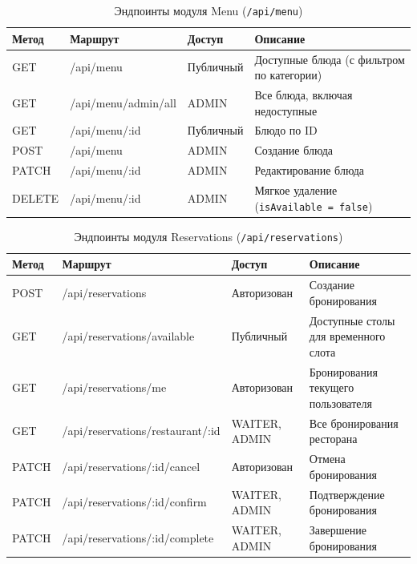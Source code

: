 \begin{table}[H]
\centering
\caption{Эндпоинты модуля Menu (\texttt{/api/menu})}
\label{tab:api_menu}
\begin{tabular}{|p{1.8cm}|p{5.4cm}|p{2.6cm}|p{4.8cm}|}
\hline
\textbf{Метод} & \textbf{Маршрут} & \textbf{Доступ} &
\textbf{Описание} \\
\hline
GET    & /api/menu           & Публичный &
  Доступные блюда (с фильтром по категории) \\ \hline
GET    & /api/menu/admin/all & ADMIN &
  Все блюда, включая недоступные \\ \hline
GET    & /api/menu/:id       & Публичный &
  Блюдо по ID \\ \hline
POST   & /api/menu           & ADMIN &
  Создание блюда \\ \hline
PATCH  & /api/menu/:id       & ADMIN &
  Редактирование блюда \\ \hline
DELETE & /api/menu/:id       & ADMIN &
  Мягкое удаление (\texttt{isAvailable = false}) \\ \hline
\end{tabular}
\end{table}
\begin{table}[H]
\centering
\caption{Эндпоинты модуля Reservations (\texttt{/api/reservations})}
\label{tab:api_reservations}
\begin{tabular}{|p{1.4cm}|p{5.8cm}|p{2.6cm}|p{4.8cm}|}
\hline
\textbf{Метод} & \textbf{Маршрут} & \textbf{Доступ} &
\textbf{Описание} \\
\hline
POST  & /api/reservations                  & Авторизован &
  Создание бронирования \\ \hline
GET   & /api/reservations/available        & Публичный &
  Доступные столы для временного слота \\ \hline
GET   & /api/reservations/me               & Авторизован &
  Бронирования текущего пользователя \\ \hline
GET   & /api/reservations/restaurant/:id   & WAITER, ADMIN &
  Все бронирования ресторана \\ \hline
PATCH & /api/reservations/:id/cancel       & Авторизован &
  Отмена бронирования \\ \hline
PATCH & /api/reservations/:id/confirm      & WAITER, ADMIN &
  Подтверждение бронирования \\ \hline
PATCH & /api/reservations/:id/complete     & WAITER, ADMIN &
  Завершение бронирования \\ \hline
\end{tabular}
\end{table}

